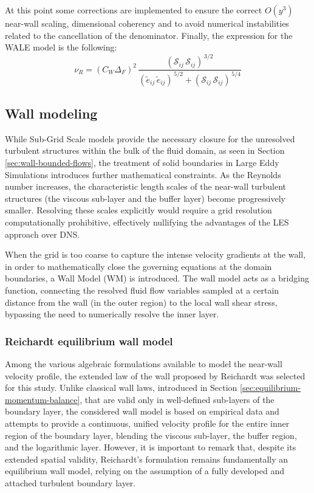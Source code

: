 \documentclass[12pt, a4paper, twoside, openright]{book}
\begin{document}
At this point some corrections are implemented to ensure the correct  $O(y^3)$ near-wall scaling, dimensional coherency and to avoid numerical instabilities related to the cancellation of the denominator. Finally, the expression for the WALE model is the following:
\begin{equation}
	\nu_R = (C_W \Delta_F)^2 \, \frac{(\mathcal{S}_{ij} \, \mathcal{S}_{ij})^{\,3/2}}{(\widetilde{e}_{ij} \, \widetilde{e}_{ij})^{\, 5/2} + (\mathcal{S}_{ij} \, \mathcal{S}_{ij})^{\,5/4}}
	\label{eq:wale_viscosity}
\end{equation}

\subsection{Wall modeling}
While Sub-Grid Scale models provide the necessary closure for the unresolved turbulent structures within the bulk of the fluid domain, as seen in Section \ref{sec:wall-bounded-flows}, the treatment of solid boundaries in Large Eddy Simulations introduces further mathematical constraints. As the Reynolds number increases, the characteristic length scales of the near-wall turbulent structures (the viscous sub-layer and the buffer layer) become progressively smaller. Resolving these scales explicitly would require a grid resolution computationally prohibitive, effectively nullifying the advantages of the LES approach over DNS. 

When the grid is too coarse to capture the intense velocity gradients at the wall, in order to mathematically close the governing equations at the domain boundaries, a Wall Model (WM) is introduced. The wall model acts as a bridging function, connecting the resolved fluid flow variables sampled at a certain distance from the wall (in the outer region) to the local wall shear stress, bypassing the need to numerically resolve the inner layer.

\subsubsection{Reichardt equilibrium wall model}

Among the various algebraic formulations available to model the near-wall velocity profile, the extended law of the wall proposed by Reichardt \cite{reichardt} was selected for this study. Unlike classical wall laws, introduced in Section \ref{sec:equilibrium-momentum-balance}, that are valid only in well-defined sub-layers of the boundary layer, the considered wall model is based on empirical data and attempts to provide a continuous, unified velocity profile for the entire inner region of the boundary layer, blending the viscous sub-layer, the buffer region, and the logarithmic layer. However, it is important to remark that, despite its extended spatial validity, Reichardt's formulation remains fundamentally an equilibrium wall model, relying on the assumption of a fully developed and attached turbulent boundary layer.
\end{document}
